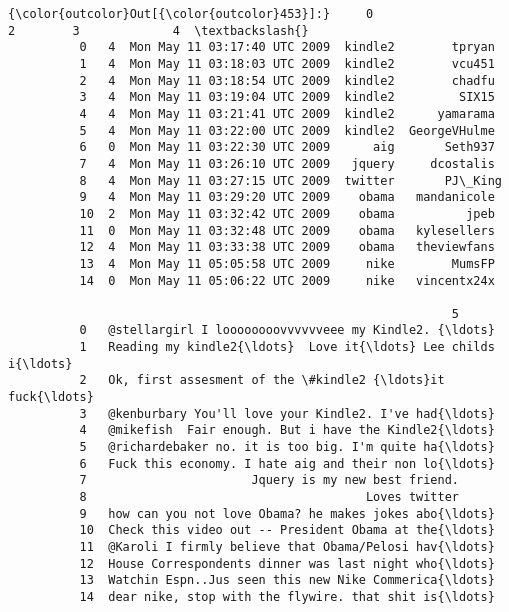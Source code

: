 \documentclass[11pt]{article}
\begin{document}
\begin{Verbatim}[commandchars=\\\{\}]
{\color{outcolor}Out[{\color{outcolor}453}]:}     0                             2        3             4  \textbackslash{}
          0   4  Mon May 11 03:17:40 UTC 2009  kindle2        tpryan   
          1   4  Mon May 11 03:18:03 UTC 2009  kindle2        vcu451   
          2   4  Mon May 11 03:18:54 UTC 2009  kindle2        chadfu   
          3   4  Mon May 11 03:19:04 UTC 2009  kindle2         SIX15   
          4   4  Mon May 11 03:21:41 UTC 2009  kindle2      yamarama   
          5   4  Mon May 11 03:22:00 UTC 2009  kindle2  GeorgeVHulme   
          6   0  Mon May 11 03:22:30 UTC 2009      aig       Seth937   
          7   4  Mon May 11 03:26:10 UTC 2009   jquery     dcostalis   
          8   4  Mon May 11 03:27:15 UTC 2009  twitter       PJ\_King   
          9   4  Mon May 11 03:29:20 UTC 2009    obama   mandanicole   
          10  2  Mon May 11 03:32:42 UTC 2009    obama          jpeb   
          11  0  Mon May 11 03:32:48 UTC 2009    obama   kylesellers   
          12  4  Mon May 11 03:33:38 UTC 2009    obama   theviewfans   
          13  4  Mon May 11 05:05:58 UTC 2009     nike        MumsFP   
          14  0  Mon May 11 05:06:22 UTC 2009     nike   vincentx24x   
          
                                                              5  
          0   @stellargirl I loooooooovvvvvveee my Kindle2. {\ldots}  
          1   Reading my kindle2{\ldots}  Love it{\ldots} Lee childs i{\ldots}  
          2   Ok, first assesment of the \#kindle2 {\ldots}it fuck{\ldots}  
          3   @kenburbary You'll love your Kindle2. I've had{\ldots}  
          4   @mikefish  Fair enough. But i have the Kindle2{\ldots}  
          5   @richardebaker no. it is too big. I'm quite ha{\ldots}  
          6   Fuck this economy. I hate aig and their non lo{\ldots}  
          7                       Jquery is my new best friend.  
          8                                       Loves twitter  
          9   how can you not love Obama? he makes jokes abo{\ldots}  
          10  Check this video out -- President Obama at the{\ldots}  
          11  @Karoli I firmly believe that Obama/Pelosi hav{\ldots}  
          12  House Correspondents dinner was last night who{\ldots}  
          13  Watchin Espn..Jus seen this new Nike Commerica{\ldots}  
          14  dear nike, stop with the flywire. that shit is{\ldots}  
\end{Verbatim}
            
\end{document}
